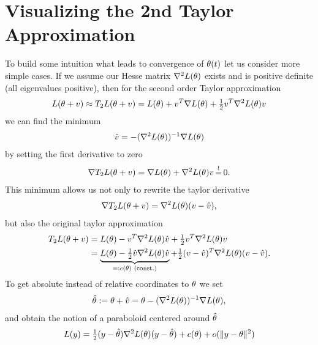 \section{Visualizing the 2nd Taylor Approximation}\label{sec: visualize gd}

To build some intuition what leads to convergence of \(\theta(t)\) let us
consider more simple cases. If we assume our Hesse matrix \(\nabla^2
L(\theta)\) exists and is positive definite (all eigenvalues positive), then for
the second order Taylor approximation
%
\begin{align*}
	L(\theta+v) \approx T_2L(\theta+v)
	= L(\theta) + v^T \nabla L(\theta) + \tfrac12 v^T \nabla^2 L(\theta) v
\end{align*}
%
we can find the minimum 
\begin{align*}
	\hat{v} = -(\nabla^2 L(\theta))^{-1}\nabla L(\theta)
\end{align*}
by setting the first derivative to zero
%
\begin{align*}
	\nabla T_2\loss(\weights+v) = \nabla \loss(\weights) + \nabla^2\loss(\weights) v \xeq{!} 0.
\end{align*}
%
This minimum allows us not only to rewrite the taylor derivative
%
\begin{align*}
	\nabla T_2L(\theta+v) = \nabla^2 L(\theta)(v-\hat{v}),
\end{align*}
%
but also the original taylor approximation
%
\begin{align*}
	T_2L(\theta+v)
	&= L(\theta) - v^T \nabla^2 L(\theta) \hat{v} + \tfrac12 v^T \nabla^2 L(\theta) v \\
	&= \underbrace{L(\theta) - \tfrac12 \hat{v} \nabla^2 L(\theta) \hat{v}}_{=: c(\theta) \text{ (const.)}}
	+ \tfrac12 (v-\hat{v})^T \nabla^2 L(\theta)(v-\hat{v}).
\end{align*}
%
To get absolute instead of relative coordinates to \(\theta\) we set
%
\begin{align*}
	\hat{\theta} := \theta + \hat{v} = \theta -(\nabla^2 L(\theta))^{-1}\nabla L(\theta),
\end{align*}
%
and obtain the notion of a paraboloid centered around \(\hat{\theta}\)
%
\begin{align}\label{paraboloid approximation of L}
	L(y) = \tfrac12 (y- \hat{\theta}) \nabla^2 L(\theta) (y-\hat{\theta}) + c(\theta) + o(\|y-\theta\|^2)
\end{align}
